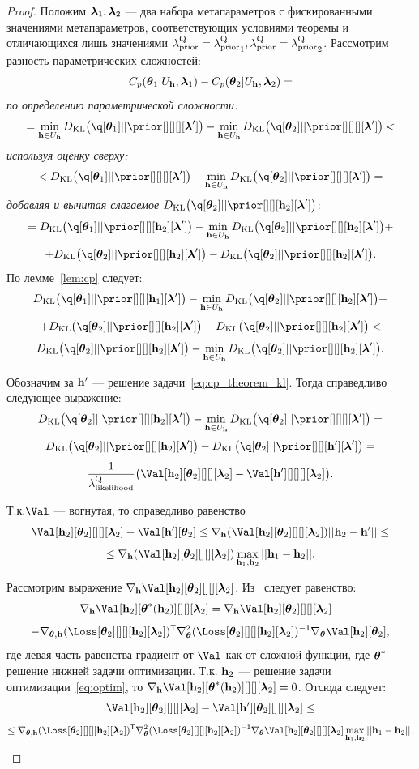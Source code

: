 \begin{proof}
Положим $\boldsymbol{\lambda}_1, \boldsymbol{\lambda}_2$ --- два набора метапараметров с фискированными значениями метапараметров, соответствующих условиями теоремы и отличающихся лишь значениями $\lambda_\text{prior}^\text{Q} = {\lambda_\text{prior}^\text{Q}}_1, \lambda_\text{prior}^\text{Q} =  {\lambda_\text{prior}^\text{Q}}_2$.
Рассмотрим разность параметрических сложностей:
\[
    C_p(\boldsymbol{\theta}_1|U_{\mathbf{h}}, \boldsymbol{\lambda}_1) - C_p(\boldsymbol{\theta}_2|U_{\mathbf{h}}, \boldsymbol{\lambda}_2) =
\]
\textit{по определению параметрической сложности:}
\[
= \min_{\h \in \Uh} \KL{\q[\teta_1]}{\prior[][][][\lam']} -  \min_{\h \in \Uh} \KL{\q[\teta_2]}{\prior[][][][\lam']} <
\]
\textit{используя оценку сверху:}
\[
 <\KL{\q[\teta_1]}{\prior[][][][\lam']} -   \min_{\h \in \Uh} \KL{\q[\teta_2]}{\prior[][][][\lam']} = 
\]
\textit{добавляя и вычитая слагаемое }$\KL{\q[\teta_2]}{\prior[][][\h_2][\lam']}$:
\[
  = \KL{\q[\teta_1]}{\prior[][][\h_2][\lam']} -   \min_{\h \in \Uh} \KL{\q[\teta_2]}{\prior[][][\h_2][\lam']} + 
\]
\[
+  \KL{\q[\teta_2]}{\prior[][][\h_2][\lam']} -   \KL{\q[\teta_2]}{\prior[][][\h_2][\lam']}. 
\]
По лемме~\ref{lem:cp} следует:
\[
   \KL{\q[\teta_1]}{\prior[][][\h_1][\lam']} -   \min_{\h \in \Uh} \KL{\q[\teta_2]}{\prior[][][\h_2][\lam']} + 
\]
\[
+  \KL{\q[\teta_2]}{\prior[][][\h_2][\lam']} -   \KL{\q[\teta_2]}{\prior[][][\h_2][\lam']} <
\]
\[
    \KL{\q[\teta_2]}{\prior[][][\h_2][\lam']} -   \min_{\h \in \Uh} \KL{\q[\teta_2]}{\prior[][][\h_2][\lam']}.
\]

Обозначим за $\mathbf{h}'$ --- решение задачи~\eqref{eq:cp_theorem_kl}.
Тогда справедливо следующее выражение:
\[
     \KL{\q[\teta_2]}{\prior[][][\h_2][\lam']} -   \min_{\h \in \Uh} \KL{\q[\teta_2]}{\prior[][][][\lam']}  = 
\]
\[
    \KL{\q[\teta_2]}{\prior[][][\h_2][\lam']} -   \KL{\q[\teta_2]}{\prior[][][\h'][\lam']} = 
\]
\[
   \frac{1}{\lamLL}\bigl(\Val[\h_2][\teta_2][][][\lam_2] -  \Val[\h'][][][][\lam_2]\bigr).
\]

Т.к.$\Val$ --- вогнутая, то справедливо равенство
\[
 \Val[\h_2][\teta_2][][][\lam_2] -  \Val[\h'][\teta_2] \leq \nabla_{\h} (\Val[\h_2][\teta_2][][][\lam_2]) ||\h_2 - \h'||  \leq
\]
\[
\leq \nabla_{\h} (\Val[\h_2][\teta_2][][][\lam_2]) \max_{\h_1, \h_2} ||\h_1 - \h_2||.
\]


Рассмотрим выражение $\nabla_{\h} \Val[\h_2][\teta_2][][][\lam_2]$. Из~\cite{hoag} следует равенство:
\[
    \nabla_{\h} \Val[\h_2][\teta^{*}(\h_2)][][][\lam_2]  = \nabla_{\h} \Val[\h_2][\teta_2][][][\lam_2] -
\]
\[
- \nabla_{\teta, \h} ({\Loss[\teta_2][][][\h_2][\lam_2]})^\mathsf{T} \nabla_{\teta}^2({\Loss[\teta_2][][][\h_2][\lam_2]})^\mathsf{-1} \nabla_{\teta}\Val[\h_2][\teta_2],
\]
где левая часть равенства градиент от $\Val$ как от сложной функции, где $\boldsymbol{\theta}^{*}$ --- решение нижней задачи оптимизации.
Т.к. $\mathbf{h}_2$ --- решение задачи оптимизации~\eqref{eq:optim}, то $\nabla_{\h} \Val[\h_2][\teta^{*}(\h_2)][][][\lam_2] = 0$.
Отсюда следует:
\[
     \Val[\h_2][\teta_2][][][\lam_2] -  \Val[\h'][\teta_2][][][\lam_2] \leq
\]
\[\leq  \nabla_{\teta, \h} (\Loss[\teta_2][][][\h_2][\lam_2])^\mathsf{T} \nabla_{\teta}^2(\Loss[\teta_2][][][\h_2][\lam_2])^\mathsf{-1} \nabla_{\teta}\Val[\h_2][\teta_2][][][\lam_2] \max_{\h_1, \h_2} ||\h_1 - \h_2||.
\]


\end{proof}
